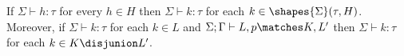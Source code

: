 \begin{lemma}
\label{lem:shape-typing}
If $\Sigma \vdash h : \tau$ for every $h \in H$ then $\Sigma \vdash k : \tau$ for each $k \in
\shapes{\Sigma}(\tau, H)$. Moreover, if $\Sigma \vdash k : \tau$ for each $k \in L$ and $\Sigma; \Gamma \vdash L, p
\matches K, L'$ then $\Sigma \vdash k : \tau$ for each $k \in K \disjunion L'$.
\end{lemma}
